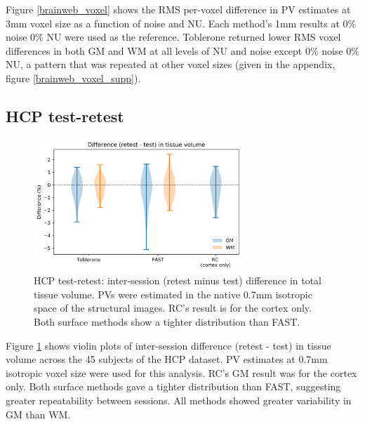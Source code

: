 \documentclass[12pt]{report}
\begin{document}
Figure \ref{brainweb_voxel} shows the RMS per-voxel difference in PV estimates at 3mm voxel size as a function of noise and NU. Each method’s 1mm results at 0\% noise 0\% NU were used as the reference. Toblerone returned lower RMS voxel differences in both GM and WM at all levels of NU and noise except 0\% noise 0\% NU, a pattern that was repeated at other voxel sizes (given in the appendix, figure \ref{brainweb_voxel_supp}).

\subsection{HCP test-retest}

\begin{figure}[H]
\centering
\includegraphics[width = 0.7\textwidth]{hcp_total.png}
\caption{HCP test-retest: inter-session (retest minus test) difference in total tissue volume. PVs were estimated in the native 0.7mm isotropic space of the structural images. RC’s result is for the cortex only. Both surface methods show a tighter distribution than FAST.}
\label{hcp_total}
\end{figure}

Figure \ref{hcp_total} shows violin plots of inter-session difference (retest - test) in tissue volume across the 45 subjects of the HCP dataset. PV estimates at 0.7mm isotropic voxel size were used for this analysis. RC’s GM result was for the cortex only. Both surface methods gave a tighter distribution than FAST, suggesting greater repeatability between sessions. All methods showed greater variability in GM than WM.
\end{document}
